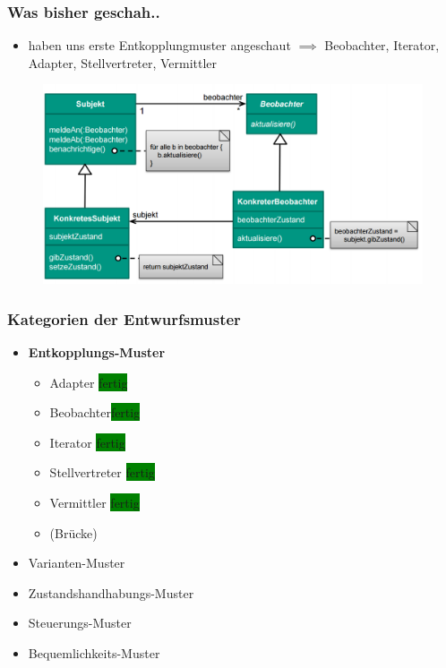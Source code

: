 \documentclass[18pt]{beamer}
\begin{document}
	\begin{frame}
		\frametitle{Was bisher geschah..}
		\begin{itemize}
			\item haben uns erste Entkopplungmuster angeschaut
			\linebreak $\implies$ Beobachter, Iterator, Adapter, Stellvertreter, Vermittler
		\end{itemize}
		\begin{figure}
			\includegraphics[scale=0.35]{./pics/tut3/obs.png}
		\end{figure}
	\end{frame}


	\begin{frame}
		\frametitle{Kategorien der Entwurfsmuster}
		\begin{itemize}
			\item \textbf{Entkopplungs-Muster}
			\begin{itemize}
				\item Adapter \colorbox{green}{fertig}
				\item Beobachter\colorbox{green}{fertig}
				\item Iterator \colorbox{green}{fertig}
				\item Stellvertreter \colorbox{green}{fertig}
				\item Vermittler \colorbox{green}{fertig}
				\item (Brücke)
			\end{itemize}
			\item Varianten-Muster
			\item Zustandshandhabungs-Muster
			\item Steuerungs-Muster
			\item Bequemlichkeits-Muster
		\end{itemize}
	\end{frame}
\end{document}
